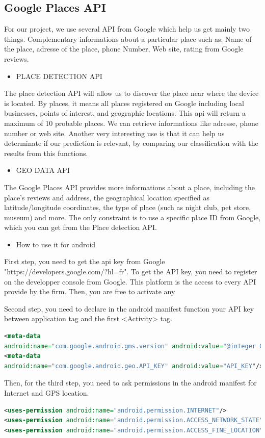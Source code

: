 \subsection{Google Places API}
For our project, we use several API from Google which help us get mainly two things. Complementary informations about a particular place such as: Name of the place, adresse of the place, phone Number, Web site, rating from Google reviews.
\begin{itemize}
    \item {PLACE DETECTION API}
\end{itemize}
The place detection API will allow us to discover the place near where the device is located. By places, it means all places registered on Google including local businesses, points of interest, and geographic locations. This api will return a maximum of 10 probable places. We can retrieve informations like adresse, phone number or web site.
Another very interesting use is that it can help us determinate if our prediction is relevant, by comparing our classification with the results from this functions.

\begin{itemize}
    \item {GEO DATA API}
\end{itemize}
The Google Places API provides more informations about a place, including the place's reviews and address, the geographical location specified as latitude/longitude coordinates, the type of place (such as night club, pet store, museum) and more. The only constraint is to use a specific place ID from Google, which you can get from the Place detection API.

\begin{itemize}
    \item {How to use it for android}
\end{itemize}
First step, you need to get the api key from Google "https://developers.google.com/?hl=fr". To get the API key, you need to register on the developper console from Google. This platform is the access to every API provide by the firm. Then, you are free to activate any

Second step, you need to declare in the android manifest function your API key between application tag and the first <Activity> tag.

\begin{lstlisting}[language=XML, basicstyle=\scriptsize]
<meta-data
android:name="com.google.android.gms.version" android:value="@integer Google_play_services_version"/>
<meta-data
android:name="com.google.android.geo.API_KEY" android:value="API_KEY"/>
\end{lstlisting}
Then, for the third step, you need to ask permissions in the android manifest for Internet and GPS location.
\begin{lstlisting}[language=XML, basicstyle=\scriptsize]
<uses-permission android:name="android.permission.INTERNET"/>
<uses-permission android:name="android.permission.ACCESS_NETWORK_STATE"/>
<uses-permission android:name="android.permission.ACCESS_FINE_LOCATION"/>
\end{lstlisting}

